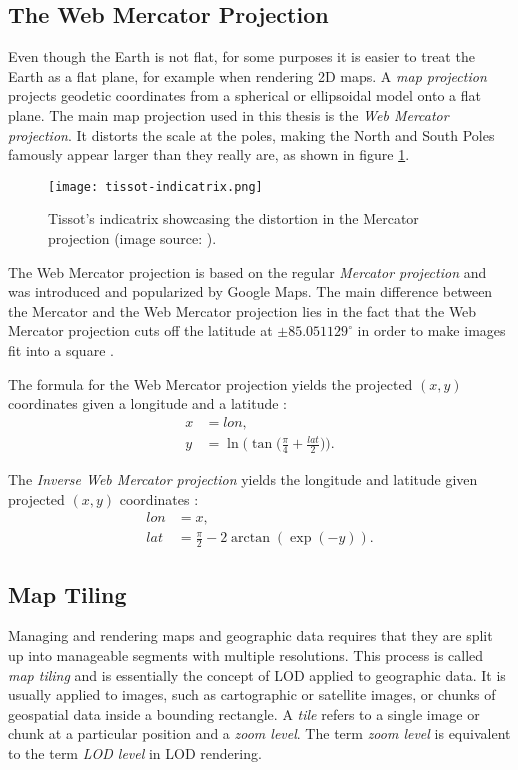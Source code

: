 \subsection{The Web Mercator Projection}
Even though the Earth is not flat, for some purposes it is easier 
to treat the Earth as a flat plane, for example when rendering 
2D maps.
A \textit{map projection} projects geodetic coordinates from a spherical or ellipsoidal model onto a flat plane.
The main map projection used in this thesis is the \textit{Web Mercator projection}.
It distorts the scale at the poles, making the North and South Poles
famously appear larger than they really are, as shown in figure \ref{fig:tissot-indicatrix}.

\begin{figure}[H]
  \centering  
  \texttt{[image: tissot-indicatrix.png]}
  \caption{Tissot's indicatrix showcasing the distortion in the Mercator projection (image source: \cite{wikipediatissotindicatrix}).}\label{fig:tissot-indicatrix}
\end{figure}

The Web Mercator projection is based on the 
regular \textit{Mercator projection} and was introduced and popularized by Google Maps. 
The main difference between the Mercator and the Web Mercator projection lies in 
the fact that the Web Mercator projection cuts off 
the latitude at $\pm 85.051129^{\circ}$
in order to make images fit into a square \cite{wikipediawebmerc}.

The formula for the Web Mercator projection yields the projected $(x,y)$ coordinates given a longitude and a latitude \cite{webmerc}:
\begin{align*}
  x &= lon,\\
  y &= \ln \Big(\tan \Big( \frac{\pi}{4} + \frac{lat}{2}\Big)\Big).
\end{align*}

The \textit{Inverse Web Mercator projection} yields the longitude and latitude 
given projected $(x,y)$ coordinates \cite{webmerc}:
\begin{align*}
  lon &= x,\\
  lat &= \frac{\pi}{2} - 2 \arctan (\exp(-y)).
\end{align*}

\subsection{Map Tiling}
Managing and rendering maps and geographic data requires that they are split up into manageable segments
with multiple resolutions. This process is called \textit{map tiling} and is essentially 
the concept of LOD applied to geographic data. It is usually applied to 
images, such as cartographic or satellite images, or chunks of 
geospatial data inside a bounding rectangle. A \textit{tile} refers to 
a single image or chunk at a particular position and a \textit{zoom level}.
The term \textit{zoom level} is equivalent to the term \textit{LOD level} in LOD rendering.

